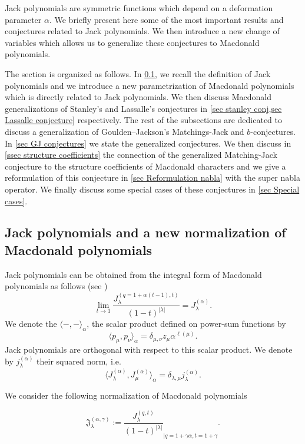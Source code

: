 \documentclass[12pt]{amsart}
\theoremstyle{remark}
\newcommand{\Jla}{J^{(\alpha)}_{\lambda}}
\newcommand{\J}{{J}^{(q,t)}}
\newcommand{\JJack}{{\mathfrak J}^{(\alpha,\gamma)}}
\begin{document}
Jack polynomials are symmetric functions which depend on a deformation parameter $\alpha$. We briefly present here some of the most important results and conjectures related to Jack polynomials. We then introduce a new change of variables which allows us to generalize these conjectures to Macdonald polynomials.

The section is organized as follows.  
In \cref{sec Jack polynomials}, we recall the definition of Jack polynomials and we introduce a new parametrization of Macdonald polynomials which is directly related to Jack polynomials. We then discuss Macdonald generalizations of Stanley's and Lassalle's conjectures in \cref{sec stanley conj,sec Lassalle conjecture} respectively. The rest of the subsections are dedicated to discuss a generalization of Goulden--Jackson's Matchings-Jack and $b$-conjectures. In \cref{sec GJ conjectures} we state the generalized conjectures. We then discuss in \cref{ssec structure coefficients} the connection of the generalized Matching-Jack conjecture to the structure coefficients of Macdonald characters and we give a reformulation of this conjecture in \cref{sec Reformulation nabla} with the super nabla operator. We finally discuss some special cases of these conjectures in \cref{sec Special cases}.
 
\subsection{Jack polynomials and a new normalization of Macdonald polynomials}\label{sec Jack polynomials}
Jack polynomials can be obtained from the integral form of Macdonald polynomials as follows (see \cite[Chapter VI, eq (10.23)]{Macdonald1995})
\begin{equation}\label{eq Jack from Macdonald}
    \lim_{t\rightarrow 1}\frac{J_\lambda^{(q=1+\alpha(t-1),t)}}{(1-t)^{|\lambda|}}=\Jla.
\end{equation}
We denote the $\langle-,-\rangle_\alpha$, the scalar product defined on power-sum functions by
$$\langle p_\mu,p_\nu\rangle_\alpha=\delta_{\mu,\nu} z_\mu \alpha^{\ell(\mu)} .$$
Jack polynomials are orthogonal with respect to this scalar product. We denote by $j^{(\alpha)}_\lambda$ their squared norm, i.e.
$$\langle J^{(\alpha)}_\lambda,J_\mu^{(\alpha)}\rangle_\alpha=\delta_{\lambda,\mu}j^{(\alpha)}_\lambda.$$

\bigskip 

We consider the following normalization of Macdonald polynomials

$$\JJack_\lambda:=\frac{\J_\lambda}{(1-t)^{|\lambda|}}_{\big|q=1+\gamma\alpha,t=1+\gamma}.$$
\end{document}
